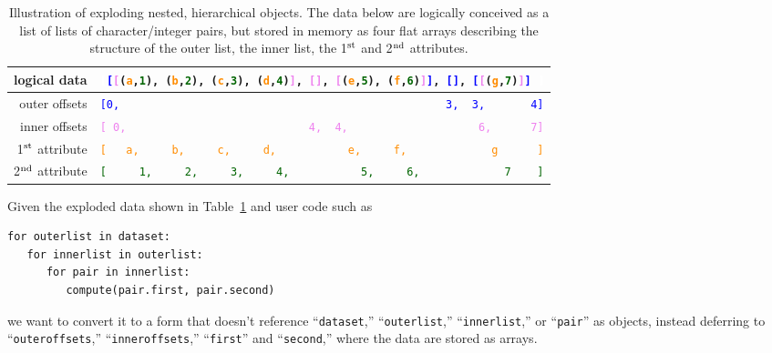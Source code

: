 \documentclass[a4paper]{jpconf}
\begin{document}
\begin{table}
\caption{\label{tab:exploding} Illustration of exploding nested, hierarchical objects. The data below are logically conceived as a list of lists of character/integer pairs, but stored in memory as four flat arrays describing the structure of the outer list, the inner list, the 1$^{\mbox{\scriptsize st}}$ and 2$^{\mbox{\scriptsize nd}}$ attributes.}

\begin{center}
\begin{tabular}{r l}
logical data & {\tt\small \textcolor{white}{[}\textcolor{blue}{[}\textcolor{violet}{[}(\textcolor{darkorange}{a},\textcolor{darkgreen}{1}), (\textcolor{darkorange}{b},\textcolor{darkgreen}{2}), (\textcolor{darkorange}{c},\textcolor{darkgreen}{3}), (\textcolor{darkorange}{d},\textcolor{darkgreen}{4})\textcolor{violet}{]}, \textcolor{violet}{[]}, \textcolor{violet}{[}(\textcolor{darkorange}{e},\textcolor{darkgreen}{5}), (\textcolor{darkorange}{f},\textcolor{darkgreen}{6})\textcolor{violet}{]}\textcolor{blue}{]}, \textcolor{blue}{[]}, \textcolor{blue}{[}\textcolor{violet}{[}(\textcolor{darkorange}{g},\textcolor{darkgreen}{7})\textcolor{violet}{]}\textcolor{blue}{]}\ \textcolor{white}{]}} \\\hline
outer offsets & {\tt\small \textcolor{blue}{[0,\ \ \ \ \ \ \ \ \ \ \ \ \ \ \ \ \ \ \ \ \ \ \ \ \ \ \ \ \ \ \ \ \ \ \ \ \ \ \ \ \ \ \ \ \ \ \ \ \ \ 3,\ \ 3,\ \ \ \ \ \ \ 4]}} \\
inner offsets & {\tt\small \textcolor{violet}{[\ 0,\ \ \ \ \ \ \ \ \ \ \ \ \ \ \ \ \ \ \ \ \ \ \ \ \ \ \ \ 4,\ \ 4,\ \ \ \ \ \ \ \ \ \ \ \ \ \ \ \ \ \ \ \ 6,\ \ \ \ \ \ 7]}} \\
1$^{\mbox{\scriptsize st}}$ attribute & {\tt\small \textcolor{darkorange}{[\ \ \ a,\ \ \ \ \ b,\ \ \ \ \ c,\ \ \ \ \ d,\ \ \ \ \ \ \ \ \ \ \ e,\ \ \ \ \ f,\ \ \ \ \ \ \ \ \ \ \ \ \ g\ \ \ \ \ \ ]}} \\
2$^{\mbox{\scriptsize nd}}$ attribute & {\tt\small \textcolor{darkgreen}{[\ \ \ \ \ 1,\ \ \ \ \ 2,\ \ \ \ \ 3,\ \ \ \ \ 4,\ \ \ \ \ \ \ \ \ \ \ 5,\ \ \ \ \ 6,\ \ \ \ \ \ \ \ \ \ \ \ \ 7\ \ \ \ ]}}
\end{tabular}
\end{center}
\vspace{-0.5 cm}
\end{table}

Given the exploded data shown in Table~\ref{tab:exploding} and user code such as
\begin{center}
\begin{minipage}{0.7\linewidth}
\begin{verbatim}
for outerlist in dataset:
   for innerlist in outerlist:
      for pair in innerlist:
         compute(pair.first, pair.second)
\end{verbatim}
\end{minipage}
\end{center}
we want to convert it to a form that doesn't reference ``{\tt dataset},'' ``{\tt outerlist},'' ``{\tt innerlist},'' or ``{\tt pair}'' as objects, instead deferring to ``{\tt outeroffsets},'' ``{\tt inneroffsets},'' ``{\tt first}'' and ``{\tt second},'' where the data are stored as arrays.
\end{document}
